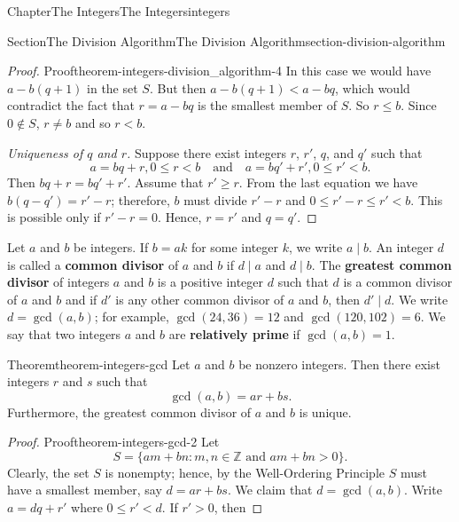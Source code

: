 \documentclass[oneside,10pt,]{book}
\newcommand{\terminology}[1]{\textbf{#1}}
\numberwithin{equation}{section}
\newcommand{\lt}{<}
\newcommand{\gt}{>}
\begin{document}
\begin{chapterptx}{Chapter}{The Integers}{}{The Integers}{}{}{integers}
\begin{sectionptx}{Section}{The Division Algorithm}{}{The Division Algorithm}{}{}{section-division-algorithm}
\begin{introduction}{}
\begin{proof}{Proof}{}{theorem-integers-division_algorithm-4}
In this case we would have \(a - b(q + 1)\) in the set \(S\). But then \(a - b(q + 1) \lt a - bq\), which would contradict the fact that \(r = a - bq\) is the smallest member  of \(S\). So \(r \leq b\).  Since \(0 \notin S\), \(r \neq b\) and so \(r \lt b\).%
\par
\emph{Uniqueness of \(q\) and \(r\).} Suppose there exist integers \(r\), \(r'\), \(q\), and \(q'\) such that%
\begin{equation*}
a = bq + r, 0 \leq r \lt b \quad \text{and}\quad a = bq' + r', 0 \leq r' \lt b\text{.}
\end{equation*}
Then \(bq + r =  bq' + r'\).  Assume that \(r' \geq r\).  From the last equation we have \(b(q - q') = r' - r\); therefore, \(b\) must divide \(r' - r\) and \(0 \leq r'- r \leq r' \lt b\).  This is possible only if \(r' - r = 0\).  Hence, \(r = r'\) and  \(q = q'\).%
\end{proof}
Let \(a\) and \(b\) be integers.  If \(b = ak\) for some integer \(k\), we write \(a \mid b\).  An integer \(d\) is called a \terminology{common divisor} of \(a\) and \(b\) if \(d \mid a\) and \(d \mid b\).  The \terminology{greatest common divisor} of integers \(a\) and \(b\) is a positive integer \(d\) such that \(d\) is a common divisor  of \(a\) and \(b\) and if \(d'\) is any other common divisor of \(a\) and \(b\), then \(d' \mid d\). \label{section-division-algorithm-2-3-24}\label{section-division-algorithm-2-3-25}  We write \(d = \gcd(a, b)\); for example, \(\gcd( 24, 36) = 12\) and \(\gcd(120, 102) = 6\).  We say that two integers \(a\) and \(b\) are \terminology{relatively prime} if \(\gcd( a, b ) = 1\).%
\begin{theorem}{Theorem}{}{}{theorem-integers-gcd}%
Let \(a\) and \(b\) be nonzero integers. Then there exist integers \(r\) and \(s\) such that%
\begin{equation*}
\gcd( a, b) = ar + bs\text{.}
\end{equation*}
Furthermore, the greatest common divisor of \(a\) and \(b\) is unique.%
\end{theorem}
\begin{proof}{Proof}{}{theorem-integers-gcd-2}
Let%
\begin{equation*}
S = \{ am + bn : m, n \in {\mathbb Z} \text{ and } am + bn \gt 0 \}\text{.}
\end{equation*}
Clearly, the set \(S\) is nonempty; hence, by the Well-Ordering Principle \(S\) must have a smallest member, say \(d = ar + bs\).  We claim that \(d = \gcd( a, b)\).  Write \(a = dq + r'\) where \(0 \leq r' \lt d\). If \(r' \gt 0\), then%

\end{proof}
\end{introduction}
\end{sectionptx}
\end{chapterptx}
\end{document}
